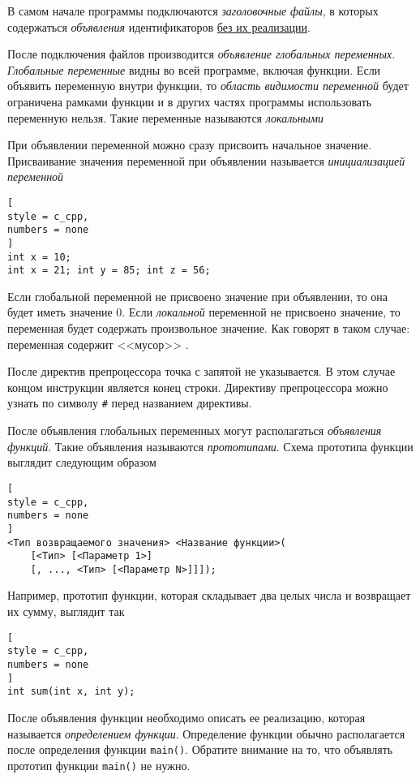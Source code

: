 \documentclass[%
	11pt,
	a4paper,
	utf8,
		]{article}
\begin{document}
В самом начале программы подключаются \emph{заголовочные файлы}, в которых содержаться \emph{объявления} идентификаторов \underline{без их реализации}.

После подключения файлов производится \emph{объявление глобальных переменных}. \emph{Глобальные переменные} видны во всей программе, включая функции. Если объявить переменную внутри функции, то \emph{область видимости переменной} будет ограничена рамками функции и в других частях программы использовать переменную нельзя. Такие переменные называются \emph{локальными}

При объявлении переменной можно сразу присвоить начальное значение. Присваивание значения переменной при объявлении называется \emph{инициализацией переменной}
\begin{lstlisting}[
style = c_cpp,
numbers = none
]
int x = 10;
int x = 21; int y = 85; int z = 56;
\end{lstlisting}

Если глобальной переменной не присвоено значение при объявлении, то она будет иметь значение 0. Если \emph{локальной} переменной не присвоено значение, то переменная будет содержать {\color{red}произвольное значение}. Как говорят в таком случае: переменная содержит <<мусор>> \cite[]{prokhorenok-prog-c:2020}.

После директив препроцессора точка с запятой не указывается. В этом случае концом инструкции является конец строки. Директиву препроцессора можно узнать по символу \verb|#| перед названием директивы. 

После объявления глобальных переменных могут располагаться \emph{объявления функций}. Такие объявления называются \emph{прототипами}. Схема прототипа функции выглядит следующим образом
\begin{lstlisting}[
style = c_cpp,
numbers = none
]
<Тип возвращаемого значения> <Название функции>(
    [<Тип> [<Параметр 1>]
    [, ..., <Тип> [<Параметр N>]]]);
\end{lstlisting}

Например, прототип функции, которая складывает два целых числа и возвращает их сумму, выглядит так
\begin{lstlisting}[
style = c_cpp,
numbers = none
]
int sum(int x, int y);
\end{lstlisting}

После объявления функции необходимо описать ее реализацию, которая называется \emph{определением функции}. Определение функции обычно располагается после определения функции \verb|main()|. Обратите внимание на то, что объявлять прототип функции \verb|main()| не нужно.
\end{document}
